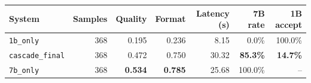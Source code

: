 \begin{tabular}{lrrrrrr}
\toprule
System & Samples & Quality & Format & Latency (s) & 7B rate & 1B accept \\
\midrule
\texttt{1b\_only} & 368 & 0.195 & 0.236 & 8.15 & 0.0\% & 100.0\% \\
\rowcolor{paceTealLight}
\texttt{cascade\_final} & 368 & 0.472 & 0.750 & 30.32 & \textbf{85.3\%} & \textbf{14.7\%} \\
\texttt{7b\_only} & 368 & \textbf{0.534} & \textbf{0.785} & 25.68 & 100.0\% & -- \\
\bottomrule
\end{tabular}
